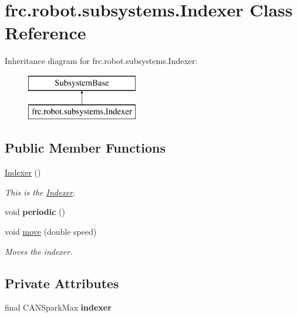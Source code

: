 \hypertarget{classfrc_1_1robot_1_1subsystems_1_1_indexer}{}\section{frc.\+robot.\+subsystems.\+Indexer Class Reference}
\label{classfrc_1_1robot_1_1subsystems_1_1_indexer}
Inheritance diagram for frc.\+robot.\+subsystems.\+Indexer\+:\begin{figure}[H]
\begin{center}
\leavevmode
\includegraphics[height=2.000000cm]{classfrc_1_1robot_1_1subsystems_1_1_indexer}
\end{center}
\end{figure}
\subsection*{Public Member Functions}
\begin{DoxyCompactItemize}
\item 
\mbox{\label{classfrc_1_1robot_1_1subsystems_1_1_indexer_a3d518803bf79352b33eab601f089fc30}} 
\mbox{\hyperlink{classfrc_1_1robot_1_1subsystems_1_1_indexer_a3d518803bf79352b33eab601f089fc30}{Indexer}} ()
\begin{DoxyCompactList}\small\item\em This is the \mbox{\hyperlink{classfrc_1_1robot_1_1subsystems_1_1_indexer}{Indexer}}. \end{DoxyCompactList}\item 
\mbox{\label{classfrc_1_1robot_1_1subsystems_1_1_indexer_a95189cc2248659469edb76e035bdf6c5}} 
void {\bfseries periodic} ()
\item 
void \mbox{\hyperlink{classfrc_1_1robot_1_1subsystems_1_1_indexer_ac0dd21785d508a1ed3fcf084fccc05bc}{move}} (double speed)
\begin{DoxyCompactList}\small\item\em Moves the indexer. \end{DoxyCompactList}\end{DoxyCompactItemize}
\subsection*{Private Attributes}
\begin{DoxyCompactItemize}
\item 
\mbox{\label{classfrc_1_1robot_1_1subsystems_1_1_indexer_ab8daadcb2eecc00138e5908423cd4d04}} 
final C\+A\+N\+Spark\+Max {\bfseries indexer}
\end{DoxyCompactItemize}


